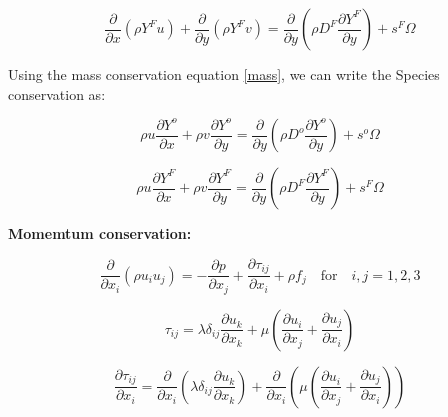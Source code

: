 \begin{equation} 
\frac{\partial}{\partial x}(\rho Y^{F}u)+
\frac{\partial}{\partial y}(\rho Y^{F}v)=
\frac{\partial}{\partial y}\left(\rho D^F\frac{\partial Y^F}{\partial y}\right)+
s^{F}\Omega
\end{equation} 

Using the mass conservation equation \ref{mass}, we can write 
the Species conservation as:

\begin{equation} 
\rho u\frac{\partial Y^{o}}{\partial x}+
\rho v\frac{\partial Y^{o}}{\partial y}=
\frac{\partial}{\partial y}\left(\rho D^o\frac{\partial Y^o}{\partial y}\right)+
s^{o}\Omega
\end{equation} 

\begin{equation} 
\rho u\frac{\partial Y^{F}}{\partial x}+
\rho v\frac{\partial Y^{F}}{\partial y}=
\frac{\partial}{\partial y}\left(\rho D^F\frac{\partial Y^F}{\partial y}\right)+
s^{F}\Omega
\end{equation} 


\textbf{Momemtum conservation:}

\begin{equation} 
\frac{\partial}{\partial x_i}(\rho u_iu_j)=-
\frac{\partial p}{\partial x_j}+
\frac{\partial \tau_{ij}}{\partial x_i}+
\rho f_j
\quad \text{for} \quad i,j=1,2,3
\end{equation} 

\begin{equation} 
\tau_{ij}=
\lambda \delta_{ij}\frac{\partial u_k}{\partial x_k}+
\mu\left(\frac{\partial u_i}{\partial x_j}+\frac{\partial u_j}{\partial x_i}\right)
\end{equation} 

\begin{equation} 
\frac{\partial\tau_{ij}}{\partial x_i}=
\frac{\partial}{\partial x_i}\left(\lambda \delta_{ij}\frac{\partial u_k}{\partial x_k}\right)+
\frac{\partial}{\partial x_i}\left(\mu\left(\frac{\partial u_i}{\partial x_j}
+\frac{\partial u_j}{\partial x_i}\right)\right)
\end{equation} 


